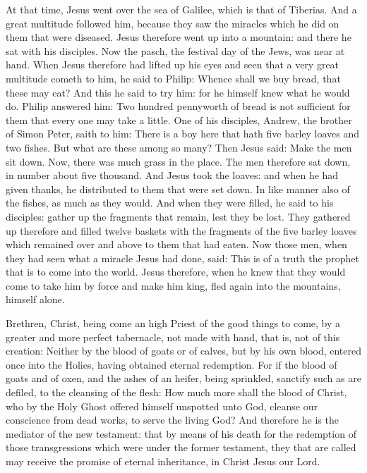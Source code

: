 

At that time, Jesus went over the sea of Galilee, which is that of
Tiberias.  And a great multitude followed him, because they saw the miracles
which he did on them that were diseased.  Jesus therefore went up into a
mountain: and there he sat with his disciples.  Now the pasch, the festival day
of the Jews, was near at hand.  When Jesus therefore had lifted up his eyes and
seen that a very great multitude cometh to him, he said to Philip: Whence shall
we buy bread, that these may eat?  And this he said to try him: for he himself
knew what he would do.  Philip answered him: Two hundred pennyworth of bread is
not sufficient for them that every one may take a little.  One of his
disciples, Andrew, the brother of Simon Peter, saith to him: There is a boy
here that hath five barley loaves and two fishes.  But what are these among so
many?  Then Jesus said: Make the men sit down. Now, there was much grass in the
place. The men therefore sat down, in number about five thousand.  And Jesus
took the loaves: and when he had given thanks, he distributed to them that were
set down. In like manner also of the fishes, as much as they would.  And when
they were filled, he said to his disciples: gather up the fragments that
remain, lest they be lost.  They gathered up therefore and filled twelve
baskets with the fragments of the five barley loaves which remained over and
above to them that had eaten.  Now those men, when they had seen what a miracle
Jesus had done, said: This is of a truth the prophet that is to come into the
world.  Jesus therefore, when he knew that they would come to take him by force
and make him king, fled again into the mountains, himself alone.





Brethren, Christ, being come an high Priest of the good things to come, by a greater
and more perfect tabernacle, not made with hand, that is, not of this creation:
Neither by the blood of goats or of calves, but by his own blood, entered once
into the Holies, having obtained eternal redemption.   For if the blood of
goats and of oxen, and the ashes of an heifer, being sprinkled, sanctify such
as are defiled, to the cleansing of the flesh: How much more shall the blood of
Christ, who by the Holy Ghost offered himself unspotted unto God, cleanse our
conscience from dead works, to serve the living God?  And therefore he is the
mediator of the new testament: that by means of his death for the redemption of
those transgressions which were under the former testament, they that are
called may receive the promise of eternal inheritance, in Christ Jesus our Lord.


